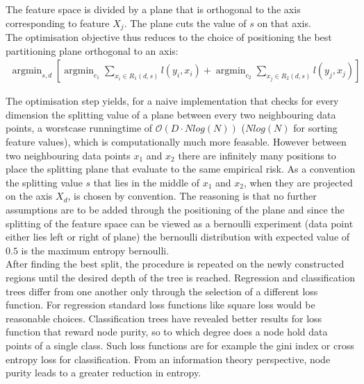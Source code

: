 \documentclass[a4paper, 11pt]{article}
\DeclareMathOperator*{\argmin}{argmin} %
\begin{document}
The feature space is divided by a plane that is orthogonal to the axis corresponding to feature $X_j$. The plane cuts the value of $s$ on that axis.\\
The optimisation objective thus reduces to the choice of positioning  the best partitioning plane orthogonal to an axis:
\begin{align*}
\argmin_{s, d}[\argmin_{c_1} \sum_{x_i \in R_1(d,s)} l(y_i, x_i) + \argmin_{c_2} \sum_{x_j \in R_2(d,s)} l(y_j, x_j)]
\end{align*}

The optimisation step yields, for a naive implementation that checks for every dimension the splitting value of a plane between every two neighbouring data points, a worstcase runningtime of $\mathcal{O}(D \cdot N log(N))$ ($Nlog(N)$ for sorting feature values), which is computationally much more feasable. However between two neighbouring data points $x_1$ and $x_2$ there are infinitely many positions to place the splitting plane that evaluate to the same empirical risk. As a convention the splitting value $s$ that lies in the middle of $x_1$ and $x_2$, when they are projected on the axis $X_d$, is chosen by convention. The reasoning is that no further assumptions are to be added through the positioning of the plane and since the splitting of the feature space can be viewed as a bernoulli experiment (data point either lies left or right of plane) the bernoulli distribution with expected value of $0.5$ is the maximum entropy bernoulli. \\

After finding the best split, the procedure is repeated on the newly constructed regions until the desired depth of the tree is reached. Regression and classification trees differ from one another only through the selection of a different loss function. For regression standard loss functions like square loss would be reasonable choices. Classification trees have revealed better results for loss function that reward node purity, so to which degree does a node hold data points of a single class. Such loss functions are for example the gini index or cross entropy loss for classification. From an information theory perspective, node purity leads to a greater reduction in entropy. \\
\end{document}
